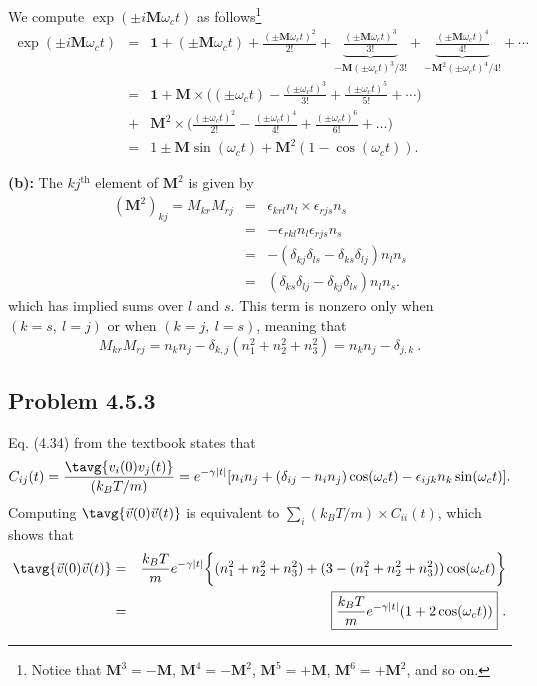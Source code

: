 We compute $\exp(\pm i \textbf{M} \omega_c t)$ as follows\footnote{Notice that $\textbf{M}^3 = -\textbf{M}$, $\textbf{M}^4 = -\textbf{M}^2$, $\textbf{M}^5 = +\textbf{M}$, $\textbf{M}^6 = +\textbf{M}^2$, and so on.}
\begin{eqnarray}
\exp(\pm i \textbf{M} \omega_c t) &=& \textbf{1} + (\pm \textbf{M} \omega_c t) + \frac{(\pm \textbf{M} \omega_c t)^2}{2!} + \underbrace{\frac{(\pm \textbf{M} \omega_c t)^3}{3!}}_{-\textbf{M} (\pm \omega_c t)^3/3!} +  \underbrace{\frac{(\pm \textbf{M} \omega_c t)^4}{4!}}_{-\textbf{M}^2 (\pm \omega_c t)^4/4!} + \cdots \nonumber \\
&=& \textbf{1} + \textbf{M} \times \bigg((\pm \omega_c t) - \frac{(\pm \omega_c t)^3}{3!} + \frac{(\pm \omega_c t)^5}{5!} + \cdots \bigg) \nonumber \\
&+& \textbf{M}^2\times  \bigg( \frac{(\pm \omega_c t)^2}{2!} -  \frac{(\pm \omega_c t)^4}{4!} +  \frac{(\pm \omega_c t)^6}{6!} + \ldots \bigg) \nonumber \\
&=& \boxed{1 \pm \textbf{M} \sin(\omega_c t) + \textbf{M}^2 (1-\cos(\omega_c t))}.
\end{eqnarray}

\textbf{(b):} The $kj^{\text{th}}$ element of $\textbf{M}^2$ is given by
\begin{eqnarray}
(\textbf{M}^2)_{kj} = M_{kr} M_{rj} &=& \epsilon_{krl} n_l \times \epsilon_{rjs} n_s \nonumber \\
&=& -\epsilon_{rkl} n_l \epsilon_{rjs}  n_s \nonumber \\
&=& -(\delta_{kj} \delta_{ls} - \delta_{ks} \delta_{lj}) n_l n_s \nonumber \\
&=& (\delta_{ks} \delta_{lj}-\delta_{kj} \delta_{ls}) n_l n_s.
\end{eqnarray}
which has implied sums over $l$ and $s$. This term is nonzero only when $(k=s,~l=j)$ or when $(k=j,~l=s)$, meaning that 
\begin{equation}
\boxed{M_{kr} M_{rj} = n_k n_j - \delta_{k,j} (n_1^2 + n_2^2 + n_3^2) = n_k n_j - \delta_{j, k}}~.
\end{equation}

\subsection{Problem 4.5.3}

Eq. (4.34) from the textbook states that
\begin{equation}
C_{ij}(t)= \frac{\tavg{v_i(0) v_j(t)}}{(k_B T/m)} = e^{-\gamma |t|} [ n_i n_j + (\delta_{ij} - n_i n_j) \cos(\omega_c t) - \epsilon_{ijk} n_k \sin(\omega_c t)].
\end{equation}
Computing $\tavg{\vec{v}(0) \vec{v}(t)}$ is equivalent to $\sum_{i}(k_B T/m) \times C_{ii}(t)$, which shows that
\begin{eqnarray}
\tavg{\vec{v}(0) \vec{v}(t)} &=& \frac{k_B T}{m} e^{-\gamma |t|} \bigg\{ (n_1^2 + n_2^2 + n_3^2) + (3 -(n_1^2 + n_2^2 + n_3^2)) \cos(\omega_c t) \bigg\} \\
&=& \boxed{\frac{k_B T}{m} e^{-\gamma |t|} ( 1 + 2 \cos(\omega_c t))}~.
\end{eqnarray}

